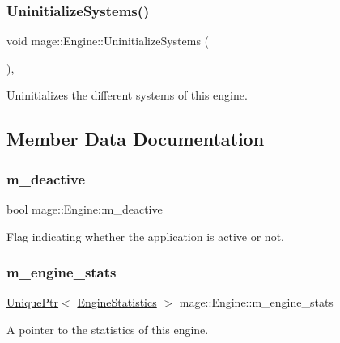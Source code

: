 \subsubsection{\texorpdfstring{Uninitialize\+Systems()}{UninitializeSystems()}}
{\footnotesize\ttfamily void mage\+::\+Engine\+::\+Uninitialize\+Systems (\begin{DoxyParamCaption}{ }\end{DoxyParamCaption})\hspace{0.3cm}{\ttfamily [private]}, {\ttfamily [noexcept]}}

Uninitializes the different systems of this engine. 

\subsection{Member Data Documentation}
\hypertarget{classmage_1_1_engine_ab8a4b0157403708ae7d1d018a95b4c63}{}\label{classmage_1_1_engine_ab8a4b0157403708ae7d1d018a95b4c63} 
\subsubsection{\texorpdfstring{m\+\_\+deactive}{m\_deactive}}
{\footnotesize\ttfamily bool mage\+::\+Engine\+::m\+\_\+deactive\hspace{0.3cm}{\ttfamily [private]}}

Flag indicating whether the application is active or not. \hypertarget{classmage_1_1_engine_aa0c82f248a2fbec3fbf778665a440edc}{}\label{classmage_1_1_engine_aa0c82f248a2fbec3fbf778665a440edc} 
\subsubsection{\texorpdfstring{m\+\_\+engine\+\_\+stats}{m\_engine\_stats}}
{\footnotesize\ttfamily \hyperlink{namespacemage_a3316d7143a973e37adf1110f2e80ca31}{Unique\+Ptr}$<$ \hyperlink{classmage_1_1_engine_statistics}{Engine\+Statistics} $>$ mage\+::\+Engine\+::m\+\_\+engine\+\_\+stats\hspace{0.3cm}{\ttfamily [private]}}

A pointer to the statistics of this engine. \hypertarget{classmage_1_1_engine_a95557e1b6cba52b393c94d80d80bea4c}{}\label{classmage_1_1_engine_a95557e1b6cba52b393c94d80d80bea4c} 
